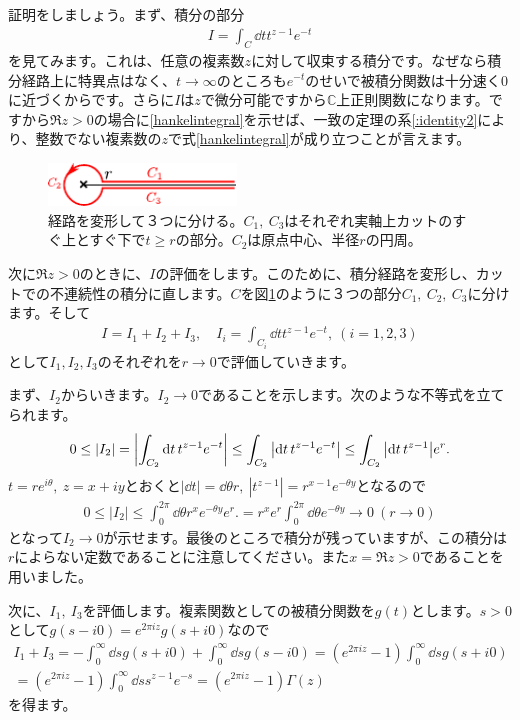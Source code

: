 \documentclass[report,paper=a4, fontsize=12pt, line_length=16cm, number_of_lines=33,dvipdfmx]{jlreq}
\numberwithin{equation}{section}
\newcommand{\Cb}{\mathbb{C}}
\begin{document}
証明をしましょう。まず、積分の部分
\begin{align}
  I=\int_{C}\dd{t}t^{z-1}e^{-t}
\end{align}
を見てみます。これは、任意の複素数$z$に対して収束する積分です。なぜなら積分経路上に特異点はなく、$t\to \infty$のところも$e^{-t}$のせいで被積分関数は十分速く$0$に近づくからです。さらに$I$は$z$で微分可能ですから$\Cb$上正則関数になります。ですから$\Re z>0$の場合に\eqref{hankelintegral}を示せば、一致の定理の系\ref{:identity2}により、整数でない複素数の$z$で式\eqref{hankelintegral}が成り立つことが言えます。

\begin{figure}[htbp]
  \centering
  \includegraphics[width=5cm]{hankel2.pdf}
  \caption{経路を変形して３つに分ける。$C_1, \ C_3$はそれぞれ実軸上カットのすぐ上とすぐ下で$t\ge r$の部分。$C_2$は原点中心、半径$r$の円周。}
  \label{fig:hankel2}
\end{figure}
次に$\Re z>0$のときに、$I$の評価をします。このために、積分経路を変形し、カットでの不連続性の積分に直します。$C$を図\ref{fig:hankel2}のように３つの部分$C_1,\ C_2,\ C_3$に分けます。そして
\begin{align}
  I=I_1+I_2+I_3,\quad I_i=\int_{C_i}\dd{t}t^{z-1}e^{-t},\ (i=1,2,3)
\end{align}
として$I_1,I_2,I_3$のそれぞれを$r\to 0$で評価していきます。

まず、$I_2$からいきます。$I_2\to 0$であることを示します。次のような不等式を立てられます。
\begin{align}
  0\le |I_2|=\qty|\int_{C_2}\dd{t}t^{z-1}e^{-t}|\le
  \int_{C_2}\qty|\dd{t}t^{z-1}e^{-t}|
  \le \int_{C_2}\qty|\dd{t}t^{z-1}|e^{r}.
\end{align}
$t=re^{i\theta},\ z=x+iy$とおくと$|\dd{t}|=\dd{\theta}r,\ |t^{z-1}|=r^{x-1}e^{-\theta y}$となるので
\begin{align}
  0\le |I_2|
  \le \int_{0}^{2\pi}\dd{\theta} r^{x}e^{-\theta y}e^{r}.
  = r^{x}e^{r}\int_{0}^{2\pi}\dd{\theta} e^{-\theta y}\to 0\ (r\to 0)
\end{align}
となって$I_2\to 0$が示せます。最後のところで積分が残っていますが、この積分は$r$によらない定数であることに注意してください。また$x=\Re z>0$であることを用いました。

次に、$I_1,\ I_3$を評価します。複素関数としての被積分関数を$g(t)$とします。$s>0$として$g(s-i0)=e^{2\pi i z} g(s+i0)$なので
\begin{align}
  I_1+I_3=-\int_{0}^{\infty}\dd{s} g(s+i0)+\int_{0}^{\infty}\dd{s}g(s-i0)
  =(e^{2\pi iz}-1)\int_{0}^{\infty}\dd{s} g(s+i0)\nonumber\\
  =(e^{2\pi iz}-1)\int_{0}^{\infty}\dd{s} s^{z-1}e^{-s}
  =(e^{2\pi iz}-1)\Gamma(z)
\end{align}
を得ます。
\end{document}
